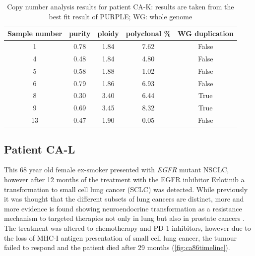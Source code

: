\begin{table}[ht]
\caption[Copy number analysis results for patient CA-K]{Copy number analysis results for patient CA-K: results are taken from the best fit result of PURPLE; WG: whole genome}\label{tab:ca82cnv}
\centering
{}
\begin{tabular}{|c|c|c|c|c|}
\toprule
\hline
 \rowcolor{gray!50}
\textbf{Sample number} & \textbf{purity} & \textbf{ploidy} & \textbf{polyclonal \%} & \textbf{WG duplication}\\
\hline
 1 & \num{0.78} &	 \num{1.84} &	\num{7.62} & False	\\
 4 & \num{0.48} & \num{1.84} & \num{4.80} & False \\
 5 & \num{0.58} & \num{1.88} & \num{1.02} & False \\
 6 & \num{0.79} & \num{1.86} & \num{6.93} & False \\
 8 & \num{0.30} & \num{3.40} & \num{6.44} & True \\
 9 & \num{0.69} & \num{3.45} & \num{8.32} & True \\
 13 & \num{0.47} & \num{1.90} & \num{0.05} & False \\
 \hline
\bottomrule
\end{tabular}
\end{table} 


\cleardoublepage


\subsection{Patient CA-L}
\label{cascade-sec:CA86}

This 68 year old female ex-smoker presented with \textit{EGFR} mutant NSCLC, however after 12 months of the treatment with the EGFR inhibitor Erlotinib a transformation to small cell lung cancer (SCLC) was detected. While previously it was thought that the different subsets of lung cancers are distinct, more and more evidence is found showing neuroendocrine transformation as a resistance mechanism to targeted therapies not only in lung but also in prostate cancers \cite{Oser2015,Aggarwal2018}. The treatment was altered to chemotherapy and PD-1 inhibitors, however due to the loss of MHC-I antigen presentation of small cell lung cancer, the tumour failed to respond \cite{Burr2019} and the patient died after 29 months (\autoref{fig:ca86timeline}).

